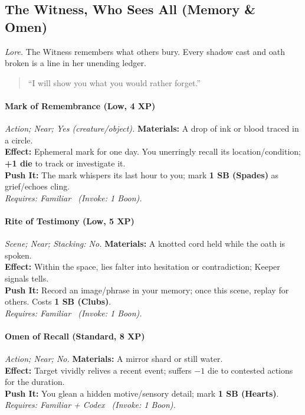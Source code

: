\subsection{The Witness, Who Sees All (Memory \& Omen)}
\textit{Lore.} The Witness remembers what others bury. Every shadow cast and oath broken is a line in her unending ledger.

\begin{quote}
“I will show you what you would rather forget.”
\end{quote}

\paragraph{Mark of Remembrance (Low, 4 XP)} \emph{Action; Near; Yes (creature/object).}
\textbf{Materials:} A drop of ink or blood traced in a circle.\\
\textbf{Effect:} Ephemeral mark for one day. You unerringly recall its location/condition; \textbf{+1 die} to track or investigate it.\\
\textbf{Push It:} The mark whispers its last hour to you; mark \textbf{1 SB (Spades)} as grief/echoes cling.\\
\emph{Requires: Familiar \ (\textit{Invoke:} 1 Boon).}

\paragraph{Rite of Testimony (Low, 5 XP)} \emph{Scene; Near; Stacking: No.}
\textbf{Materials:} A knotted cord held while the oath is spoken.\\
\textbf{Effect:} Within the space, lies falter into hesitation or contradiction; Keeper signals tells.\\
\textbf{Push It:} Record an image/phrase in your memory; once this scene, replay for others. Costs \textbf{1 SB (Clubs)}.\\
\emph{Requires: Familiar \ (\textit{Invoke:} 1 Boon).}

\paragraph{Omen of Recall (Standard, 8 XP)} \emph{Action; Near; No.}
\textbf{Materials:} A mirror shard or still water.\\
\textbf{Effect:} Target vividly relives a recent event; suffers \(-1\) die to contested actions for the duration.\\
\textbf{Push It:} You glean a hidden motive/sensory detail; mark \textbf{1 SB (Hearts)}.\\
\emph{Requires: Familiar + Codex \ (\textit{Invoke:} 1 Boon).}


